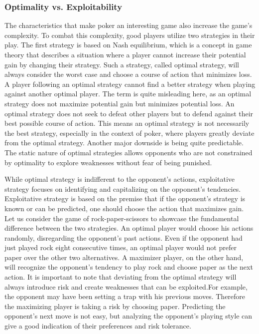 \subsubsection{Optimality vs. Exploitability}
The characteristics that make poker an interesting game also increase the game's complexity. To combat this complexity, good players utilize two strategies in their play. The first strategy is based on Nash equilibrium, which is a concept in game theory that describes a situation where a player cannot increase their potential gain by changing their strategy. Such a strategy, called optimal strategy, will always consider the worst case and choose a course of action that minimizes loss. A player following an optimal strategy cannot find a better strategy when playing against another optimal player. The term  is quite misleading here, as an optimal strategy does not maximize potential gain but minimizes potential loss. An optimal strategy does not seek to defeat other players but to defend against their best possible course of action. This means an optimal strategy is not necessarily the best strategy, especially in the context of poker, where players greatly deviate from the optimal strategy. Another major downside is being quite predictable. The static nature of optimal strategies allows opponents who are not constrained by optimality to explore weaknesses
without fear of being punished.

While optimal strategy is indifferent to the opponent's actions, exploitative strategy focuses on identifying and capitalizing on the opponent's tendencies. Exploitative strategy is based on the premise that if the opponent's strategy is known or can be predicted, one should choose the action that maximizes gain. Let us consider the game of rock-paper-scissors to showcase the fundamental difference between the two strategies. An optimal player would choose his actions randomly, disregarding the opponent's past actions. Even if the opponent had just played rock eight consecutive times, an optimal player would not prefer paper over the other two alternatives. A maximizer player, on the other hand, will recognize the opponent's tendency to play rock and choose paper as the next action. It is important to note that deviating from the optimal strategy will always introduce risk and create weaknesses that can be exploited.For example, the opponent may have been setting a trap with his previous moves. Therefore the maximizing player is taking a risk by choosing paper. Predicting the opponent's next move is not easy, but analyzing the opponent's playing style can give a good indication of their preferences and risk tolerance.

